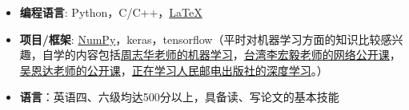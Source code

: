   \begin{itemize}[leftmargin=*]
    \item \textbf{编程语言}: Python，C/C++，\href{https://www.latex-project.org/}{\LaTeX}
    \item \textbf{项目/框架}: \href{http://www.numpy.org/}{NumPy}，keras，tensorflow（平时对机器学习方面的知识比较感兴趣，自学的内容包括\href{https://item.jd.com/11867803.html}{周志华老师的机器学习}，\href{https://www.bilibili.com/video/av48285039}{台湾李宏毅老师的网络公开课}，\href{https://www.bilibili.com/video/av29430384?from=search&seid=9138381229268458220}{吴恩达老师的公开课}，\href{https://item.jd.com/12128543.html}{正在学习人民邮电出版社的深度学习}。）
    \item \textbf{语言}：英语四、六级均达500分以上，具备读、写论文的基本技能
  \end{itemize}